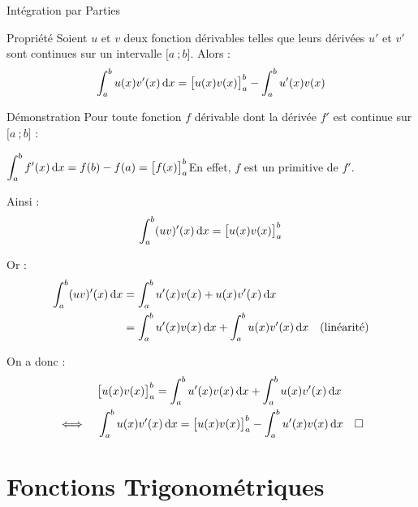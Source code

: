\documentclass{coursbook}
\begin{document}
    \begin{Gpartie}{Intégration par Parties} 
        \begin{Spartie}{Propriété} 
            Soient $u$ et $v$ deux fonction dérivables telles que leurs dérivées $u'$ et $v'$ sont continues sur un intervalle $\big[a~;b\big]$. Alors : \[\int_a^b u(x)v'(x)\,\mathrm{d}x=\big[u(x)v(x)\big]_a^b-\int_a^b u'(x)v(x)\]
            \begin{SSpartie}{Démonstration} 
                Pour toute fonction $f$ dérivable dont la dérivée $f'$ est continue sur $\big[a~;b\big]$ :

                $\displaystyle \int_a^b f'(x)\,\mathrm{d}x=f(b)-f(a)=\big[f(x)\big]_a^b$\quad En effet, $f$ est un primitive de $f'$.

                Ainsi : \[\displaystyle \int_a^b (u v)'(x)\,\mathrm{d}x=\big[u(x)v(x)\big]_a^b\]

                Or : 
                \[\begin{aligned}[t]
                    \int_a^b (u v)'(x)\,\mathrm{d}x &= \int_a^b u'(x)v(x)+u(x)v'(x)\,\mathrm{d}x \\
                    &=\int_a^b u'(x)v(x)\,\mathrm{d}x + \int_a^b u(x)v'(x)\,\mathrm{d}x\quad\text{(linéarité)}
                \end{aligned}\]

                On a donc :
                \[\begin{aligned}[t]
                    &\quad\big[u(x)v(x)\big]_a^b = \int_a^b u'(x)v(x)\,\mathrm{d}x + \int_a^b u(x)v'(x)\,\mathrm{d}x \\
                    \iff&\quad\int_a^b u(x)v'(x)\,\mathrm{d}x=\big[u(x)v(x)\big]_a^b-\int_a^b u'(x)v(x)\,\mathrm{d}x\quad\square
                \end{aligned}\]
            \end{SSpartie}
        \end{Spartie}
    \end{Gpartie}





\chapter{Fonctions Trigonométriques}
\end{document}
